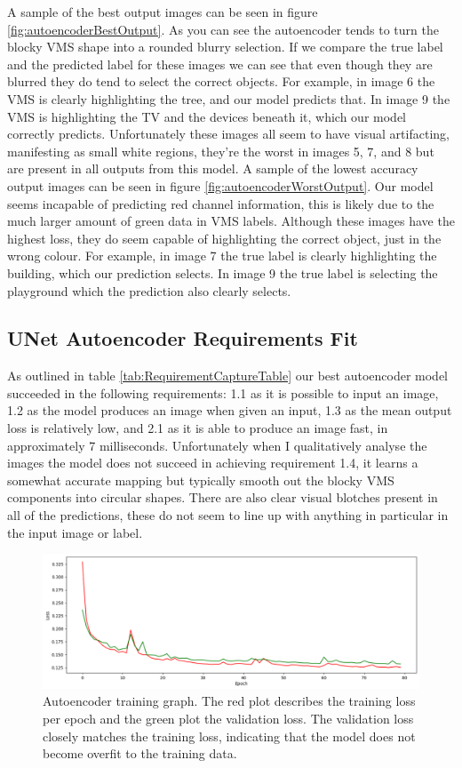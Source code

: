 \documentclass{UoYCSproject}
\begin{document}
A sample of the best output images can be seen in figure \ref{fig:autoencoderBestOutput}.
As you can see the autoencoder tends to turn the blocky VMS shape into a rounded blurry selection.
If we compare the true label and the predicted label for these images we can see that even though they are blurred they do tend to select the correct objects. For example, in image 6 the VMS is clearly highlighting the tree, and our model predicts that. In image 9 the VMS is highlighting the TV and the devices beneath it, which our model correctly predicts. Unfortunately these images all seem to have visual artifacting, manifesting as small white regions, they're the worst in images 5, 7, and 8 but are present in all outputs from this model. 
A sample of the lowest accuracy output images can be seen in figure \ref{fig:autoencoderWorstOutput}. 
Our model seems incapable of predicting red channel information, this is likely due to the much larger amount of green data in VMS labels. Although these images have the highest loss, they do seem capable of highlighting the correct object, just in the wrong colour. For example, in image 7 the true label is clearly highlighting the building, which our prediction selects. In image 9 the true label is selecting the playground which the prediction also clearly selects.

\subsection{UNet Autoencoder Requirements Fit}

As outlined in table \ref{tab:RequirementCaptureTable} our best autoencoder model succeeded in the following requirements: 1.1 as it is possible to input an image, 1.2 as the model produces an image when given an input, 1.3 as the mean output loss is relatively low, and 2.1 as it is able to produce an image fast, in approximately 7 milliseconds.
Unfortunately when I qualitatively analyse the images the model does not succeed in achieving requirement 1.4, it learns a somewhat accurate mapping but typically smooth out the blocky VMS components into circular shapes. There are also clear visual blotches present in all of the predictions, these do not seem to line up with anything in particular in the input image or label.   

\begin{figure}[ht]
    \centering
    \includegraphics[width=\linewidth]{Autoencoder Training Curve}
    \caption{Autoencoder training graph. The red plot describes the training loss per epoch and the green plot the validation loss. The validation loss closely matches the training loss, indicating that the model does not become overfit to the training data.}
    \label{fig:autoencoderTraining}
\end{figure}
\end{document}
